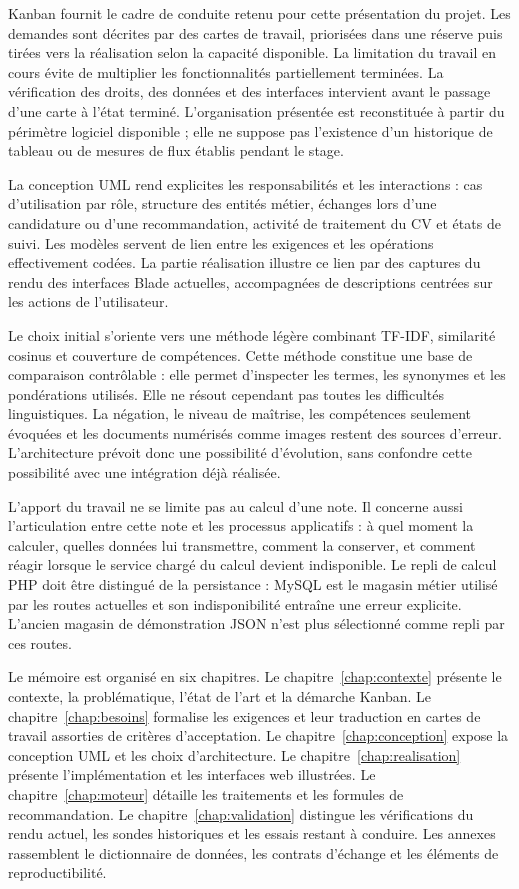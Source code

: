 Kanban fournit le cadre de conduite retenu pour cette présentation du projet. Les demandes sont décrites par des cartes de travail, priorisées dans une réserve puis tirées vers la réalisation selon la capacité disponible. La limitation du travail en cours évite de multiplier les fonctionnalités partiellement terminées. La vérification des droits, des données et des interfaces intervient avant le passage d'une carte à l'état terminé. L'organisation présentée est reconstituée à partir du périmètre logiciel disponible ; elle ne suppose pas l'existence d'un historique de tableau ou de mesures de flux établis pendant le stage.

La conception UML rend explicites les responsabilités et les interactions : cas d'utilisation par rôle, structure des entités métier, échanges lors d'une candidature ou d'une recommandation, activité de traitement du CV et états de suivi. Les modèles servent de lien entre les exigences et les opérations effectivement codées. La partie réalisation illustre ce lien par des captures du rendu des interfaces Blade actuelles, accompagnées de descriptions centrées sur les actions de l'utilisateur.

Le choix initial s'oriente vers une méthode légère combinant TF-IDF, similarité cosinus et couverture de compétences. Cette méthode constitue une base de comparaison contrôlable : elle permet d'inspecter les termes, les synonymes et les pondérations utilisés. Elle ne résout cependant pas toutes les difficultés linguistiques. La négation, le niveau de maîtrise, les compétences seulement évoquées et les documents numérisés comme images restent des sources d'erreur. L'architecture prévoit donc une possibilité d'évolution, sans confondre cette possibilité avec une intégration déjà réalisée.

L'apport du travail ne se limite pas au calcul d'une note. Il concerne aussi l'articulation entre cette note et les processus applicatifs : à quel moment la calculer, quelles données lui transmettre, comment la conserver, et comment réagir lorsque le service chargé du calcul devient indisponible. Le repli de calcul PHP doit être distingué de la persistance : MySQL est le magasin métier utilisé par les routes actuelles et son indisponibilité entraîne une erreur explicite. L'ancien magasin de démonstration JSON n'est plus sélectionné comme repli par ces routes.

Le mémoire est organisé en six chapitres. Le chapitre~\ref{chap:contexte} présente le contexte, la problématique, l'état de l'art et la démarche Kanban. Le chapitre~\ref{chap:besoins} formalise les exigences et leur traduction en cartes de travail assorties de critères d'acceptation. Le chapitre~\ref{chap:conception} expose la conception UML et les choix d'architecture. Le chapitre~\ref{chap:realisation} présente l'implémentation et les interfaces web illustrées. Le chapitre~\ref{chap:moteur} détaille les traitements et les formules de recommandation. Le chapitre~\ref{chap:validation} distingue les vérifications du rendu actuel, les sondes historiques et les essais restant à conduire. Les annexes rassemblent le dictionnaire de données, les contrats d'échange et les éléments de reproductibilité.
